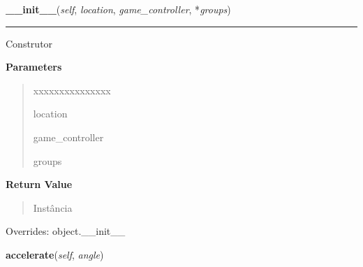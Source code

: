 \hspace{.8\funcindent}\begin{boxedminipage}{\funcwidth}

    \raggedright \textbf{\_\_init\_\_}(\textit{self}, \textit{location}, \textit{game\_controller}, *\textit{groups})

    \vspace{-1.5ex}

    \rule{\textwidth}{0.5\fboxrule}
\setlength{\parskip}{2ex}
    Construtor

\setlength{\parskip}{1ex}
      \textbf{Parameters}
      \vspace{-1ex}

      \begin{quote}
        \begin{Ventry}{xxxxxxxxxxxxxxx}

          \item[location]

          \item[game\_controller]

          \item[groups]

        \end{Ventry}

      \end{quote}

      \textbf{Return Value}
    \vspace{-1ex}

      \begin{quote}
      Instância

      \end{quote}

      Overrides: object.\_\_init\_\_

    \end{boxedminipage}

    \label{pygame-asteroids:ship:Ship:accelerate}

    \vspace{0.5ex}

\hspace{.8\funcindent}\begin{boxedminipage}{\funcwidth}

    \raggedright \textbf{accelerate}(\textit{self}, \textit{angle})

\setlength{\parskip}{2ex}
\setlength{\parskip}{1ex}
    \end{boxedminipage}

